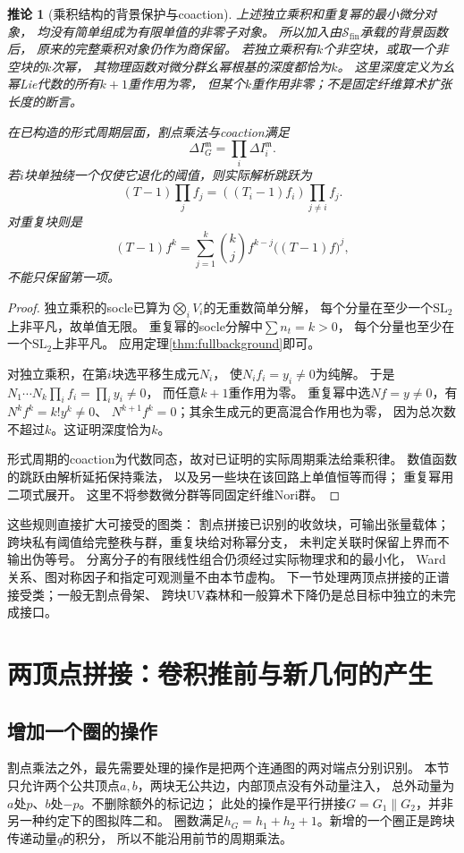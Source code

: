 \documentclass[11pt,a4paper]{ctexart}
\theoremstyle{cnplain}\newtheorem{theorem}{定理}[section]
\newtheorem{corollary}[theorem]{推论}
\theoremstyle{definition}\newtheorem{definition}[theorem]{定义}
\theoremstyle{remark}\newtheorem{remark}[theorem]{注}
\begin{document}
\begin{corollary}[乘积结构的背景保护与coaction]\label{cor:blockoperations}
上述独立乘积和重复幂的最小微分对象，
均没有简单组成为有限单值的非零子对象。
所以加入由$\mathcal S_{\mathrm{fin}}$承载的背景函数后，
原来的完整乘积对象仍作为商保留。
若独立乘积有$k$个非空块，或取一个非空块的$k$次幂，
其物理函数对微分群幺幂根基的深度都恰为$k$。
这里深度定义为幺幂Lie代数的所有$k+1$重作用为零，
但某个$k$重作用非零；不是固定纤维算术扩张长度的断言。

在已构造的形式周期层面，割点乘法与coaction满足
\[
 \Delta I_G^{\mathfrak m}
   =\prod_i\Delta I_i^{\mathfrak m}.
\]
若$i$块单独绕一个仅使它退化的阈值，则实际解析跳跃为
\[
 (T-1)\prod_j f_j=((T_i-1)f_i)\prod_{j\ne i}f_j .
\]
对重复块则是
\[
 (T-1)f^k=\sum_{j=1}^k
             \binom{k}{j}f^{k-j}\big((T-1)f\big)^j ,
\]
不能只保留第一项。
\end{corollary}
\begin{proof}
独立乘积的socle已算为$\bigotimes_iV_i$的无重数简单分解，
每个分量在至少一个$\mathrm{SL}_2$上非平凡，故单值无限。
重复幂的socle分解中$\sum n_t=k>0$，
每个分量也至少在一个$\mathrm{SL}_2$上非平凡。
应用定理\ref{thm:fullbackground}即可。

对独立乘积，在第$i$块选平移生成元$N_i$，
使$N_if_i=y_i\ne0$为纯解。
于是$N_1\cdots N_k\prod_i f_i=\prod_i y_i\ne0$，
而任意$k+1$重作用为零。
重复幂中选$Nf=y\ne0$，有$N^k f^k=k!y^k\ne0$、
$N^{k+1}f^k=0$；其余生成元的更高混合作用也为零，
因为总次数不超过$k$。这证明深度恰为$k$。

形式周期的coaction为代数同态，故对已证明的实际周期乘法给乘积律。
数值函数的跳跃由解析延拓保持乘法，
以及另一些块在该回路上单值恒等而得；
重复幂用二项式展开。
这里不将参数微分群等同固定纤维Nori群。
\end{proof}

这些规则直接扩大可接受的图类：
割点拼接已识别的收敛块，可输出张量载体；
跨块私有阈值给完整秩与群，重复块给对称幂分支，
未判定关联时保留上界而不输出伪等号。
分离分子的有限线性组合仍须经过实际物理求和的最小化，
Ward关系、图对称因子和指定可观测量不由本节虚构。
下一节处理两顶点拼接的正谱接受类；一般无割点骨架、
跨块UV森林和一般算术下降仍是总目标中独立的未完成接口。


\section{两顶点拼接：卷积推前与新几何的产生}\label{sec:twoterminal}
\subsection{增加一个圈的操作}
割点乘法之外，最先需要处理的操作是把两个连通图的两对端点分别识别。
本节只允许两个公共顶点$a,b$，两块无公共边，内部顶点没有外动量注入，
总外动量为$a$处$p$、$b$处$-p$。不删除额外的标记边；
此处的操作是平行拼接$G=G_1\parallel G_2$，并非另一种约定下的图拟阵二和。
圈数满足$h_G=h_1+h_2+1$。新增的一个圈正是跨块传递动量$q$的积分，
所以不能沿用前节的周期乘法。
\end{document}
